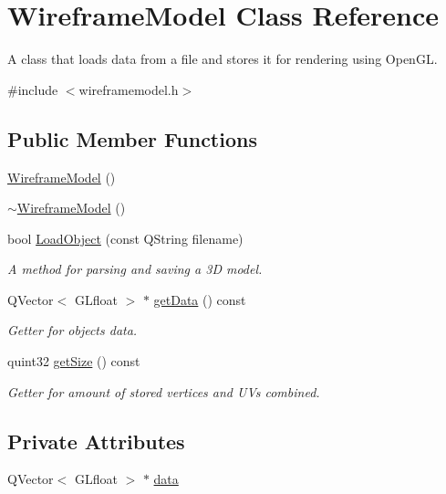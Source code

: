 \hypertarget{class_wireframe_model}{}\section{Wireframe\+Model Class Reference}
\label{class_wireframe_model}


A class that loads data from a file and stores it for rendering using Open\+GL.  




{\ttfamily \#include $<$wireframemodel.\+h$>$}

\subsection*{Public Member Functions}
\begin{DoxyCompactItemize}
\item 
\mbox{\hyperlink{class_wireframe_model_aab69007d1aea9e74f8639d6264e6b61f}{Wireframe\+Model}} ()
\item 
\mbox{\hyperlink{class_wireframe_model_a57ec6b8bf2a697a074903d42e4db90d4}{$\sim$\+Wireframe\+Model}} ()
\item 
bool \mbox{\hyperlink{class_wireframe_model_ac5f8817ea433184dda70ee25633043ae}{Load\+Object}} (const Q\+String filename)
\begin{DoxyCompactList}\small\item\em A method for parsing and saving a 3D model. \end{DoxyCompactList}\item 
Q\+Vector$<$ G\+Lfloat $>$ $\ast$ \mbox{\hyperlink{class_wireframe_model_a1d20cf72b2f6412985f5fa2fddcec3ee}{get\+Data}} () const
\begin{DoxyCompactList}\small\item\em Getter for object\textquotesingle{}s data. \end{DoxyCompactList}\item 
quint32 \mbox{\hyperlink{class_wireframe_model_a5fc0323e4618b80e1b2b227f2470b6a0}{get\+Size}} () const
\begin{DoxyCompactList}\small\item\em Getter for amount of stored vertices and UV\textquotesingle{}s combined. \end{DoxyCompactList}\end{DoxyCompactItemize}
\subsection*{Private Attributes}
\begin{DoxyCompactItemize}
\item 
Q\+Vector$<$ G\+Lfloat $>$ $\ast$ \mbox{\hyperlink{class_wireframe_model_a9fb28b2dedbdcfff31c9ccc592b8492a}{data}}
\end{DoxyCompactItemize}


